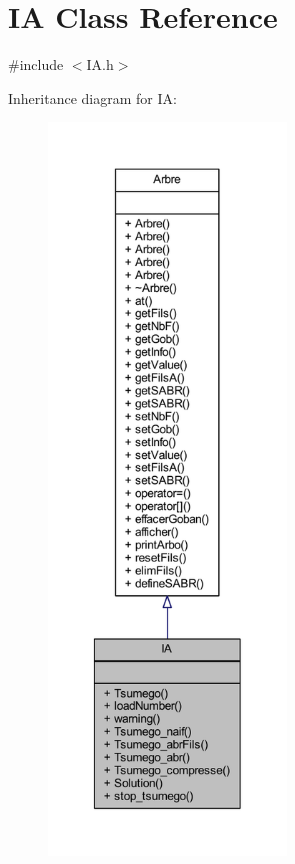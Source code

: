 \hypertarget{class_i_a}{}\section{IA Class Reference}
\label{class_i_a}


{\ttfamily \#include $<$I\+A.\+h$>$}



Inheritance diagram for IA\+:
\nopagebreak
\begin{figure}[H]
\begin{center}
\leavevmode
\includegraphics[height=550pt]{class_i_a__inherit__graph}
\end{center}
\end{figure}


